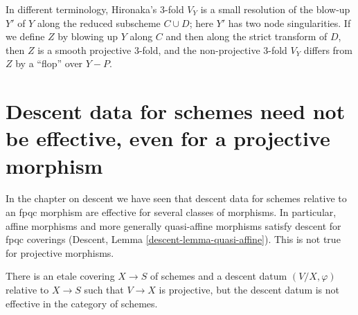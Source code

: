 \noindent
In different terminology, Hironaka's 3-fold $V_Y$ is a small
resolution of the blow-up $Y'$ of $Y$ along the reduced subscheme
$C\cup D$; here $Y'$ has two node singularities. If we define $Z$ by blowing
up $Y$ along $C$ and then along the strict transform
of $D$, then $Z$ is a smooth projective 3-fold, and the non-projective
3-fold $V_Y$ differs from $Z$ by a ``flop'' over $Y-P$.


\section{Descent data for schemes need not be effective, even for a projective morphism}
\label{section-non-effective-descent-projective}

\noindent
In the chapter on descent we have seen that descent data for schemes relative
to an fpqc morphism are effective for several classes
of morphisms. In particular, affine morphisms and more generally
quasi-affine morphisms satisfy descent for fpqc coverings
(Descent, Lemma \ref{descent-lemma-quasi-affine}).
This is not true for projective morphisms.

\begin{lemma}
\label{lemma-non-effective-descent-projective}
There is an etale covering $X\to S$ of schemes and a descent datum
$(V/X,\varphi)$ relative to $X\to S$ such that 
$V\to X$ is projective,
but the descent datum is not effective in the category of schemes.
\end{lemma}

